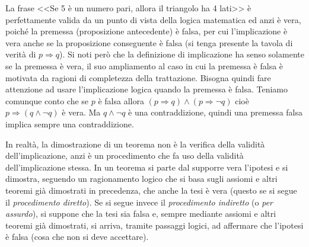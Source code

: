 La frase <<Se 5 è un numero pari, allora il triangolo ha 4 lati>> è perfettamente valida da un punto di vista della logica matematica ed anzi è vera, poiché la premessa (proposizione antecedente) è falsa, per cui l'implicazione è vera anche se la proposizione conseguente è falsa (si tenga presente la tavola di verità di $p\Rightarrow q$).
Si noti però che la definizione di implicazione ha senso solamente se la premessa è vera, il suo ampliamento al caso in cui la premessa è falsa è motivata da ragioni di completezza della trattazione. Bisogna quindi fare attenzione ad usare l'implicazione logica quando la premessa è falsa. Teniamo comunque conto che se $p$ è falsa allora $(p\Rightarrow q)\wedge (p\Rightarrow \neg q)$ cioè $p\Rightarrow (q\wedge \neg q)$ è vera. Ma $q\wedge\neg q$ è una contraddizione, quindi una premessa falsa implica sempre una contraddizione.

In realtà, la dimostrazione di un teorema non è la verifica della validità dell'implicazione, anzi è un procedimento che fa uso della validità dell'implicazione stessa. In un teorema si parte dal supporre vera l'ipotesi e si dimostra, seguendo un ragionamento logico che si basa sugli assiomi e altri teoremi già dimostrati in precedenza, che anche la tesi è vera (questo se si segue il \emph{procedimento diretto}). Se si segue invece il \emph{procedimento indiretto} (o \emph{per assurdo}), si suppone che la tesi sia falsa e, sempre mediante assiomi e altri teoremi già dimostrati, si arriva, tramite passaggi logici, ad affermare che l'ipotesi è falsa (cosa che non si deve accettare).

